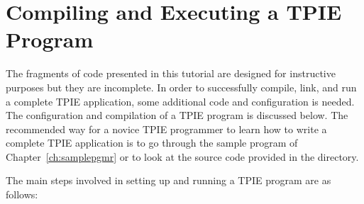

\tobewritten

\section{Compiling and Executing a TPIE Program}

The fragments of code presented in this tutorial are designed for
instructive purposes  but they are incomplete. In order to
successfully compile, link, and run a complete TPIE application, some
additional code and configuration is needed. The configuration and
compilation of a TPIE program is discussed below. The recommended way for a
novice TPIE programmer to learn how to write a complete TPIE application is
to go through the sample program of Chapter~\ref{ch:samplepgmr} or to look
at the source code provided in the  directory.

The main steps involved in setting up and running a TPIE
program are as follows:

